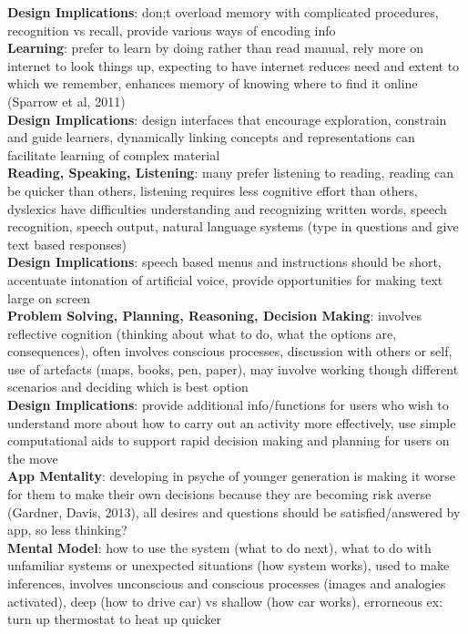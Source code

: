 \documentclass[a4paper]{article}
\begin{document}
\begin{multicols}{2}
        \textbf{Design Implications}: don;t overload memory with complicated procedures, recognition vs recall, provide various ways of encoding info\\
        \textbf{Learning}: prefer to learn by doing rather than read manual, rely more on internet to look things up, expecting to have internet reduces need and extent to which we remember, enhances memory of knowing where to find it online (Sparrow et al, 2011)\\
        \textbf{Design Implications}: design interfaces that encourage exploration, constrain and guide learners, dynamically linking concepts and representations can facilitate learning of complex material\\
        \textbf{Reading, Speaking, Listening}: many prefer listening to reading, reading can be quicker than others, listening requires less cognitive effort than others, dyslexics have difficulties understanding and recognizing written words, speech recognition, speech output, natural language systems (type in questions and give text based responses)\\
        \textbf {Design Implications}: speech based menus and instructions should be short, accentuate intonation of artificial voice, provide opportunities for making text large on screen\\
        \textbf{Problem Solving, Planning, Reasoning, Decision Making}: involves reflective cognition (thinking about what to do, what the options are, consequences), often involves conscious processes, discussion with others or self, use of artefacts (maps, books, pen, paper), may involve working though different scenarios and deciding which is best option\\
        \textbf{Design Implications}: provide additional info/functions for users who wish to understand more about how to carry out an activity more effectively, use simple computational aids to support rapid decision making and planning for users on the move\\
        \textbf{App Mentality}: developing in psyche of younger generation is making it worse for them to make their own decisions because they are becoming risk averse (Gardner, Davis, 2013), all desires and questions should be satisfied/answered by app, so less thinking?\\
        \textbf{Mental Model}: how to use the system (what to do next), what to do with unfamiliar systems or unexpected situations (how system works), used to make inferences, involves unconscious and conscious processes (images and analogies activated), deep (how to drive car) vs shallow (how car works), errorneous ex: turn up thermostat to heat up quicker\\

\end{multicols}
\end{document}
